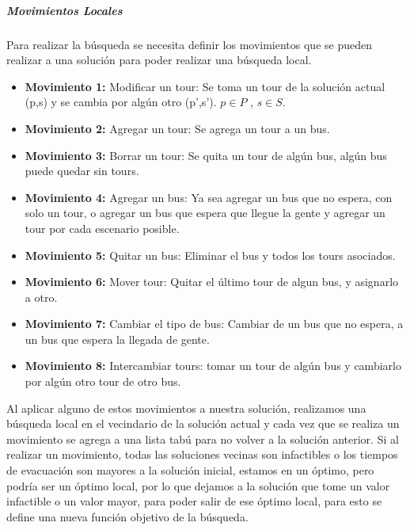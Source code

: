 \documentclass[letter, 10pt]{article}
\begin{document}
\subparagraph{Movimientos Locales}

Para realizar la búsqueda se necesita definir los movimientos que se pueden realizar a una solución para poder realizar una búsqueda local. 


\begin{itemize}
\item \textbf{Movimiento 1:} Modificar un tour: Se toma un tour de la solución actual (p,s) y se cambia por algún otro (p',s'). $p\in P$ , $s \in S$.

\item \textbf{Movimiento 2:} Agregar un tour: Se agrega un tour a un bus.

\item \textbf{Movimiento 3:} Borrar un tour: Se quita un tour de algún bus, algún bus puede quedar sin tours.

\item \textbf{Movimiento 4:} Agregar un bus: Ya sea agregar un bus que no espera, con solo un tour, o agregar un bus que espera que llegue la gente y agregar un tour por cada escenario posible.

\item \textbf{Movimiento 5:} Quitar un bus: Eliminar el bus y todos los tours asociados.

\item \textbf{Movimiento 6:} Mover tour: Quitar el último tour de algun bus, y asignarlo a otro. 

\item \textbf{Movimiento 7:} Cambiar el tipo de bus: Cambiar de un bus que no espera, a un bus que espera la llegada de gente.

\item \textbf{Movimiento 8:} Intercambiar tours: tomar un tour de algún bus y cambiarlo por algún otro tour de otro bus.
\end{itemize}

Al aplicar alguno de estos movimientos a nuestra solución, realizamos una búsqueda local en el vecindario de la solución actual y cada vez que se realiza un movimiento se agrega a una lista tabú para no volver a la solución anterior. Si al realizar un movimiento, todas las soluciones vecinas son infactibles o los tiempos de evacuación son mayores a la solución inicial, estamos en un óptimo, pero podría ser un óptimo local, por lo que dejamos a la solución que tome un valor infactible o un valor mayor, para poder salir de ese óptimo local, para esto se define una nueva función objetivo de la búsqueda.
\end{document}

